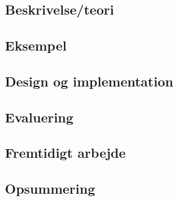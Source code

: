 \chapter{\is}
\label{chap:is}
  \section{Beskrivelse/teori}
  \section{Eksempel}
  \section{Design og implementation}
  \section{Evaluering}
  \section{Fremtidigt arbejde}
  \section{Opsummering}
